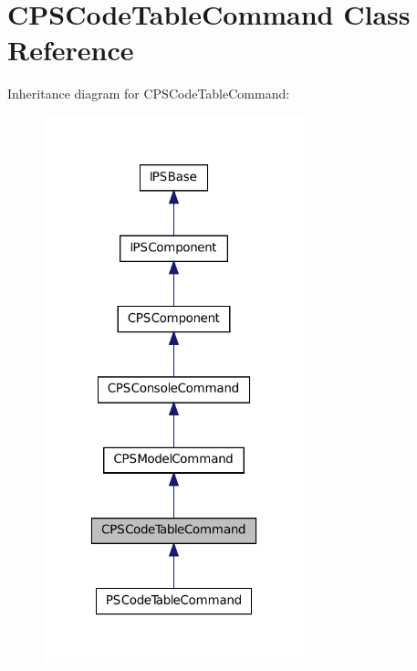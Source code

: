 \hypertarget{classCPSCodeTableCommand}{
\section{CPSCodeTableCommand Class Reference}
\label{classCPSCodeTableCommand}
}


Inheritance diagram for CPSCodeTableCommand:\nopagebreak
\begin{figure}[H]
\begin{center}
\leavevmode
\includegraphics[width=214pt]{classCPSCodeTableCommand__inherit__graph}
\end{center}
\end{figure}


